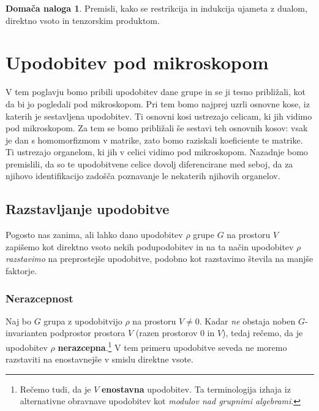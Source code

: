 \documentclass[11pt]{book}
\def\definicija{\color{rdeca}\bf}
\theoremstyle{definition}
\theoremstyle{zgled}
\theoremstyle{zgledbrezstevilke}
\theoremstyle{odprtproblem}
\theoremstyle{domacanaloga}
\newtheorem{domacanaloga}[theorem]{Domača naloga}
\theoremstyle{izrek}
\begin{document}
\begin{domacanaloga}
    Premisli, kako se restrikcija in indukcija ujameta z dualom, direktno vsoto in tenzorskim produktom.
\end{domacanaloga}

\chapter{Upodobitev pod mikroskopom}

V tem poglavju bomo pribili upodobitev dane grupe in se ji tesno približali, kot da bi jo pogledali pod mikroskopom. Pri tem bomo najprej uzrli osnovne kose, iz katerih je sestavljena upodobitev. Ti osnovni kosi ustrezajo celicam, ki jih vidimo pod mikroskopom. Za tem se bomo približali še sestavi teh osnovnih kosov: vsak je dan s homomorfizmom v matrike, zato bomo raziskali koeficiente te matrike. Ti ustrezajo organelom, ki jih v celici vidimo pod mikroskopom. Nazadnje bomo premislili, da so te upodobitvene celice dovolj diferencirane med seboj, da za njihovo identifikacijo zadošča poznavanje le nekaterih njihovih organelov.

\section{Razstavljanje upodobitve}

Pogosto nas zanima, ali lahko dano upodobitev $\rho$ grupe $G$ na prostoru $V$ zapišemo kot direktno vsoto nekih podupodobitev in na ta način upodobitev $\rho$ \emph{razstavimo} na preprostejše upodobitve, podobno kot razstavimo števila na manjše faktorje. 

\subsection{Nerazcepnost}

Naj bo $G$ grupa z upodobitvijo $\rho$ na prostoru $V \neq 0$. Kadar \emph{ne} obstaja noben $G$-invarianten podprostor prostora $V$ (razen prostorov $0$ in $V$), tedaj rečemo, da je upodobitev $\rho$ {\definicija nerazcepna}.\footnote{Rečemo tudi, da je $V$ {\definicija enostavna} upodobitev. Ta terminologija izhaja iz alternativne obravnave upodobitev kot \emph{modulov nad grupnimi algebrami}.} V tem primeru upodobitve seveda ne moremo razstaviti na enostavnejše v smislu direktne vsote.
\end{document}

